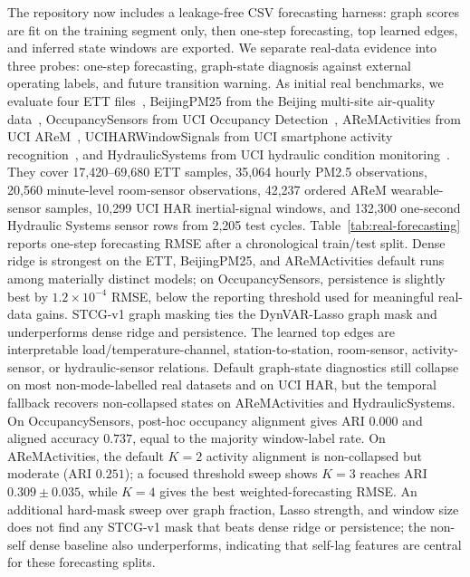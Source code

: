 \documentclass[sigconf,review,anonymous]{acmart}
\begin{document}
The repository now includes a leakage-free CSV forecasting harness: graph scores are fit on the training segment only, then one-step forecasting, top learned edges, and inferred state windows are exported.
We separate real-data evidence into three probes: one-step forecasting, graph-state diagnosis against external operating labels, and future transition warning.
As initial real benchmarks, we evaluate four ETT files~\cite{zhou2021informer}, BeijingPM25 from the Beijing multi-site air-quality data~\cite{zhang2017cautionary}, OccupancySensors from UCI Occupancy Detection~\cite{candanedo2016occupancydata,candanedo2016accurate}, AReMActivities from UCI AReM~\cite{palumbo2016arem}, UCIHARWindowSignals from UCI smartphone activity recognition~\cite{reyesortiz2012har}, and HydraulicSystems from UCI hydraulic condition monitoring~\cite{helwig2018hydraulic}.
They cover 17,420--69,680 ETT samples, 35,064 hourly PM2.5 observations, 20,560 minute-level room-sensor observations, 42,237 ordered AReM wearable-sensor samples, 10,299 UCI HAR inertial-signal windows, and 132,300 one-second Hydraulic Systems sensor rows from 2,205 test cycles.
Table~\ref{tab:real-forecasting} reports one-step forecasting RMSE after a chronological train/test split.
Dense ridge is strongest on the ETT, BeijingPM25, and AReMActivities default runs among materially distinct models; on OccupancySensors, persistence is slightly best by $1.2\times 10^{-4}$ RMSE, below the reporting threshold used for meaningful real-data gains.
STCG-v1 graph masking ties the DynVAR-Lasso graph mask and underperforms dense ridge and persistence.
The learned top edges are interpretable load/temperature-channel, station-to-station, room-sensor, activity-sensor, or hydraulic-sensor relations.
Default graph-state diagnostics still collapse on most non-mode-labelled real datasets and on UCI HAR, but the temporal fallback recovers non-collapsed states on AReMActivities and HydraulicSystems.
On OccupancySensors, post-hoc occupancy alignment gives ARI $0.000$ and aligned accuracy $0.737$, equal to the majority window-label rate.
On AReMActivities, the default $K=2$ activity alignment is non-collapsed but moderate (ARI $0.251$); a focused threshold sweep shows $K=3$ reaches ARI $0.309 \pm 0.035$, while $K=4$ gives the best weighted-forecasting RMSE.
An additional hard-mask sweep over graph fraction, Lasso strength, and window size does not find any STCG-v1 mask that beats dense ridge or persistence; the non-self dense baseline also underperforms, indicating that self-lag features are central for these forecasting splits.
\end{document}
